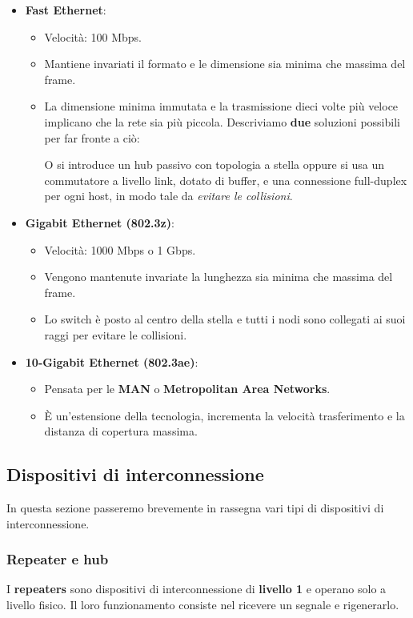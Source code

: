 \documentclass[11pt,a4paper,oneside]{book}
\theoremstyle{definition}
\begin{document}
\begin{itemize}
	\item \textbf{Fast Ethernet}:
	      \begin{itemize}
		      \item Velocità: 100 Mbps.
		      \item Mantiene invariati il formato e le dimensione sia minima che massima del frame.
		      \item La dimensione minima immutata e la trasmissione dieci volte più veloce implicano che la rete sia più piccola. Descriviamo \textbf{due} soluzioni possibili per far fronte a ciò:

		            O si introduce un hub passivo con topologia a stella oppure si usa un commutatore a livello link, dotato di buffer, e una connessione full-duplex per ogni host, in modo tale da \textit{evitare le collisioni}.
	      \end{itemize}
	\item \textbf{Gigabit Ethernet (802.3z)}:
	      \begin{itemize}
		      \item Velocità: 1000 Mbps o 1 Gbps.
		      \item Vengono mantenute invariate la lunghezza sia minima che massima del frame.
		      \item Lo switch è posto al centro della stella e tutti i nodi sono collegati ai suoi raggi per evitare le collisioni.
	      \end{itemize}
	\item \textbf{10-Gigabit Ethernet (802.3ae)}:
	      \begin{itemize}
		      \item Pensata per le \textbf{MAN} o \textbf{Metropolitan Area Networks}.
		      \item È un'estensione della tecnologia, incrementa la velocità trasferimento e la distanza di copertura massima.
	      \end{itemize}
\end{itemize}

\subsection{Dispositivi di interconnessione}
In questa sezione passeremo brevemente in rassegna vari tipi di dispositivi di interconnessione.
\subsubsection{Repeater e hub}
I \textbf{repeaters} sono dispositivi di interconnessione di \textbf{livello 1} e operano solo a livello fisico. Il loro funzionamento consiste nel ricevere un segnale e rigenerarlo.
\end{document}
